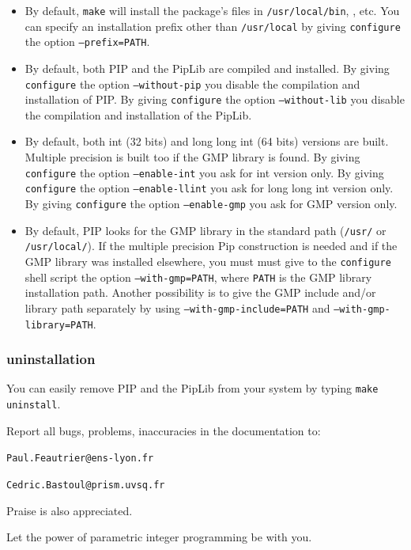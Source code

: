 \documentclass[12pt,a4paper]{article}
\begin{document}
\begin{itemize}
\item By default, {\tt make} will install the package's files in
{\tt /usr/local/bin}, , etc. You can specify an
installation prefix other than {\tt /usr/local} by giving {\tt configure} the
option {\tt --prefix=PATH}.

\item By default, both PIP and the PipLib are compiled and installed. By giving
{\tt configure} the option {\tt --without-pip} you disable the compilation and
installation of PIP. By giving {\tt configure} the option {\tt --without-lib}
you disable the compilation and installation of the PipLib.

\item By default, both int (32 bits) and long long int (64 bits) versions are
built. Multiple precision is built too if the GMP library is found.
By giving {\tt configure} the option {\tt --enable-int} you ask for int
version only. By giving {\tt configure} the option {\tt --enable-llint} you
ask for long long int version only. By giving {\tt configure} the
option {\tt --enable-gmp} you ask for GMP version only.

\item By default, PIP looks for the GMP library in the standard path
({\tt /usr/} or {\tt /usr/local/}). If the multiple precision Pip construction
is needed and if the GMP library was installed elsewhere, you must must give
to the {\tt configure} shell script the option {\tt --with-gmp=PATH}, where
{\tt PATH} is the GMP library installation path. Another possibility is to
give the GMP include and/or library path separately by using 
{\tt --with-gmp-include=PATH} and {\tt --with-gmp-library=PATH}.
\end{itemize}

\subsubsection{uninstallation}
You can easily remove PIP and the PipLib from your system by typing
{\tt make uninstall}.

\vspace{0.5cm}
Report all bugs, problems, inaccuracies in the documentation to:

{\tt Paul.Feautrier@ens-lyon.fr}

{\tt Cedric.Bastoul@prism.uvsq.fr}

Praise is also appreciated.

Let the power of parametric integer programming be with you.


\end{document}
